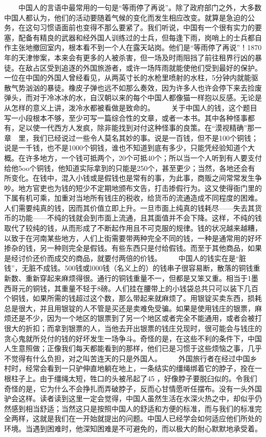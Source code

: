 \documentclass[12pt,oneside]{book}
\begin{document}
\begin{common-format}
　　中国人的言语中最常用的一句是“等雨停了再说”。除了政府部门之外，大多数中国人都认为，他们的活动要随着气候的变化而发生相应改变。就算是急迫的公务，在这句习惯语面前也变得不那么要紧了。我们听说，中国有一个很有实力的要塞，配备有精良的武器和经外国人训练过的士兵，但每逢下雨，岗哨上的士兵都自作主张地撤回室内，根本看不到一个人在露天站岗。他们是“等雨停了再说”！1870年的天津惨案，本来会有更多的人被杀害，但一场及时雨阻挡了前往租界行凶的暴徒。在敌占区受到追逐的外国旅游者，或许一场阵雨就能使他们受到最好的保护。一位在中国的外国人曾经看见，从两英寸长的水枪里喷射的水柱，5分钟内就能驱散气势汹汹的暴徒。橡皮子弹也远不如那么奏效，因为许多人也许会停下来去捡废弹头，而对于冷冰冰的水，自汉朝以来的每个中国人都像猫一样抱以反感。无论是从怎样的意义上讲，泼冷水都被看做是致命的。 
　　关于中国人的钱，这个题目写一小段根本不够，至少可写一篇综合性的文章，或者一本书。其中各种怪事都有，足以使一代西方人发疯，除非能找到对付这种怪事的良策。在“漠视精确”那一章　里，我们已经说过一些令人莫名其妙的事。说是一百钱，但不是100个铜钱；说是一千钱，也不是1000个铜钱，谁也不知道到底有多少，只能凭经验知道个大概。在许多地方，一个钱可抵两个，20个可抵40个；所以当一个人听到有人要支付给他5oo个铜钱，他知道实际拿到的只能是250个，甚至更少；当然，各地还会有所变化。在钱中，混入小钱或是假钱也是常有的事，为此事，商贩之间常常发生争吵。地方官吏也为钱的短少不定期地颁布文告，打击掺假行为。这又使得衙门里的下属有机可乘，加重对当地所有钱庄的税收，给货币的流通造成不同程度的困难。人们需要纯真的钱，因而其价值立即上升。一旦市面上纯真的钱耗尽——失去其货币的功能——不纯的钱就会到市面上流通，且其面值并不会下降。这样，不纯的钱取代了较纯的钱，从而形成了不断起作用且不可克服的规律。钱的状况越来越糟，以致于在河南某些地方，人们上街需要带两种完全不同的钱，一种是通常用的好坏掺杂的钱，另一种则完全是假钱。有些东西只是付给假钱。而至于其他商品，如果是经讨价还价而成交的商品，就要付两倍的价钱。 
　　中国人的钱实在是“脏钱”，无脏不成钱。500钱或l000钱（名义上的）的钱串子很容易断，散落的铜钱重新数、重新穿起来麻烦得很。通行的铜钱重量不一，但都是又笨又重。相当于1墨西哥元的铜钱，其重量不轻于8磅。人们挂在腰带上的小钱袋总共只可以装下几百个铜钱，如果所需的钱超过这个数，那么带起来就麻烦了。用银锭买卖东西，损耗总是很大，并且用银锭的人不管是买还是卖难免受骗。如果是使用钱庄的银票，麻烦还是不少，因为一个地区的银票到了另一个地区或者完全不能通用，或者会被打很大的折扣；而拿到银票的人，当他去开出银票的钱庄兑现时，很可能会与钱庄的贪心鬼就所兑付的钱的好坏发生一场争斗。奇怪的是，在这些不利的条件下，中国人生意照做；正像我们每天都能看到的那样，他们已是习惯于这些烦恼之事，几乎不觉得有什么负担，对之叫苦连天的只是外国人。 
　　外国旅行者在经过中国乡村时，经常会看到一只驴伸直地躺在地上，一条结实的缰绳绑着它的脖子，拴在一根柱子上。由于缰绳太短，牲口的头被吊起了45 ，好像脖子要脱臼似的。令我们奇怪的是，它为什么不会挣扎而弄破脖子，反而心甘情愿听任摆布。没有一头外国驴会这样。读者读到这里一定会觉得，中国人虽然生活在水深火热之中，却似乎仍然感到相当舒适；当然这只是按照中国人的舒适和方便的标准，而与我们的标准完全两样，这就是我们在一开始就提出的问题。中国人已经学会如何适应他们所处的环境。当遇到困难时，他深知困难是不可避免的，而以极大的耐心默默地承受着。 

\end{common-format}
\end{document}
